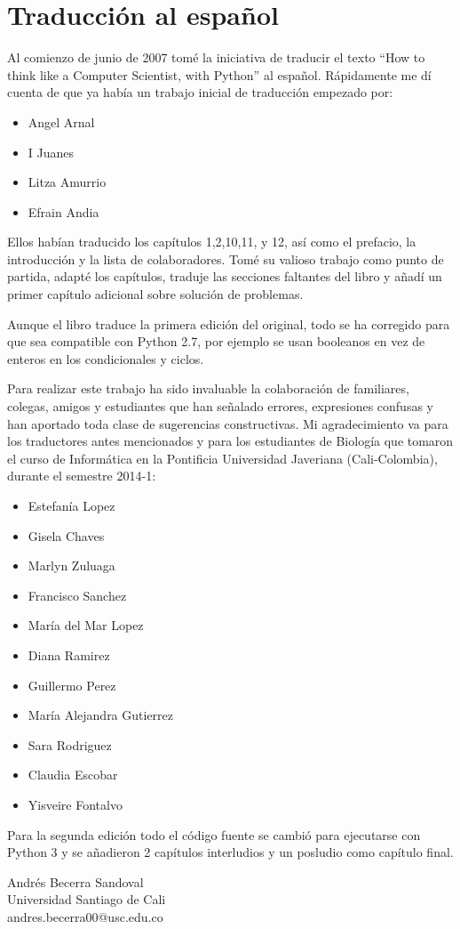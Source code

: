 
\chapter{Traducción al español}

Al comienzo de junio de 2007 tomé la iniciativa de traducir el texto
``How to think like a Computer Scientist, with Python'' al español.
Rápidamente me dí cuenta de que ya había un trabajo inicial de traducción
empezado por:
\begin{itemize}
\item Angel Arnal 
\item I Juanes 
\item Litza Amurrio 
\item Efrain Andia
\end{itemize}
Ellos habían traducido los capítulos 1,2,10,11, y 12, así como el
prefacio, la introducción y la lista de colaboradores. Tomé su valioso
trabajo como punto de partida, adapté los capítulos, traduje las secciones
faltantes del libro y añadí un primer capítulo adicional sobre solución
de problemas.

Aunque el libro traduce la primera edición del original, todo se ha
corregido para que sea compatible con Python 2.7, por ejemplo se usan
booleanos en vez de enteros en los condicionales y ciclos.

Para realizar este trabajo ha sido invaluable la colaboración de familiares,
colegas, amigos y estudiantes que han señalado errores, expresiones
confusas y han aportado toda clase de sugerencias constructivas. Mi
agradecimiento va para los traductores antes mencionados y para los
estudiantes de Biología que tomaron el curso de Informática en la
Pontificia Universidad Javeriana (Cali-Colombia), durante el semestre
2014-1:
\begin{itemize}
\item Estefanía Lopez 
\item Gisela Chaves 
\item Marlyn Zuluaga 
\item Francisco Sanchez 
\item María del Mar Lopez 
\item Diana Ramirez 
\item Guillermo Perez 
\item María Alejandra Gutierrez 
\item Sara Rodriguez 
\item Claudia Escobar
\item Yisveire Fontalvo
\end{itemize}
\vspace{0.25in}
 

Para la segunda edición todo el código fuente se cambió para ejecutarse
con Python 3 y se añadieron 2 capítulos interludios y un \flqq{}posludio\frqq{}
como capítulo final.
\begin{flushleft}
Andrés Becerra Sandoval \\
 Universidad Santiago de Cali \\
 andres.becerra00@usc.edu.co \\
\par\end{flushleft}
